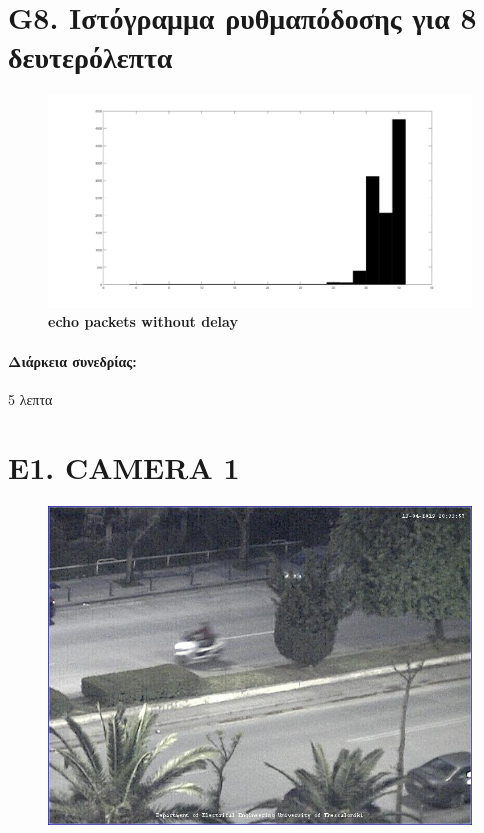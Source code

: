 \documentclass{article}
\begin{document}
\section*{G8. Ιστόγραμμα ρυθμαπόδοσης για 8 δευτερόλεπτα}

\begin{figure}[h!]
 \begin{center}
 \advance\leftskip-6.8cm
  \includegraphics[width=250mm,scale=0.7]{g8s1.jpg}
    \caption*{\textbf{echo packets without delay}}
  
\end{center}
\end{figure}
\paragraph{Διάρκεια συνεδρίας:} 5 λεπτα
\newpage
\large{}

\section*{E1. CAMERA 1}

\begin{figure}[h!]
 \begin{center}
 \advance\leftskip-4cm
  \includegraphics[width=200mm,scale=0.7]{cam1s1.jpeg}
   
  
\end{center}
\end{figure}
\newpage
\large{}
\end{document}
